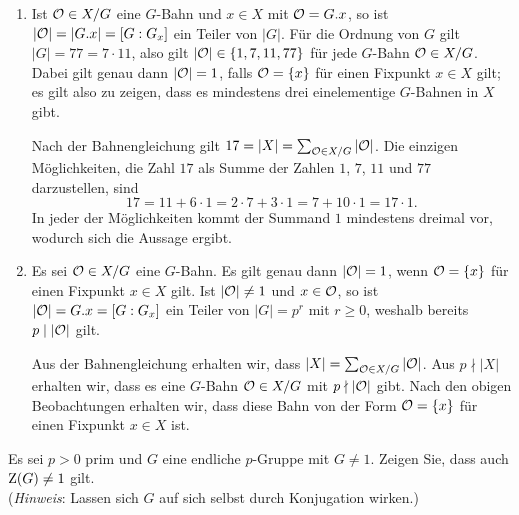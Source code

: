 \begin{solution}
  \begin{enumerate}
    \item
      Ist $\mathcal{O} \in X/G$ eine $G$-Bahn und $x \in X$ mit $\mathcal{O} = G.x$, so ist $|\mathcal{O}| = |G.x| = [G : G_x]$ ein Teiler von $|G|$.
      Für die Ordnung von $G$ gilt $|G| = 77 = 7 \cdot 11$, also gilt $|\mathcal{O}| \in \{1, 7, 11, 77\}$ für jede $G$-Bahn $\mathcal{O} \in X/G$.
      Dabei gilt genau dann $|\mathcal{O}| = 1$, falls $\mathcal{O} = \{x\}$ für einen Fixpunkt $x \in X$ gilt;
      es gilt also zu zeigen, dass es mindestens drei einelementige $G$-Bahnen in $X$ gibt.
      
      Nach der Bahnengleichung gilt $17 = |X| = \sum_{\mathcal{O} \in X/G} |\mathcal{O}|$.
      Die einzigen Möglichkeiten, die Zahl $17$ als Summe der Zahlen $1$, $7$, $11$ und $77$ darzustellen, sind
      \[
          17
        = 11 + 6 \cdot 1
        = 2 \cdot 7 + 3 \cdot 1
        = 7 + 10 \cdot 1
        = 17 \cdot 1.
      \]
      In jeder der Möglichkeiten kommt der Summand $1$ mindestens dreimal vor, wodurch sich die Aussage ergibt.
      
    \item
      Es sei $\mathcal{O} \in X/G$ eine $G$-Bahn.
      Es gilt genau dann $|\mathcal{O}| = 1$, wenn $\mathcal{O} = \{x\}$ für einen Fixpunkt $x \in X$ gilt.
      Ist $|\mathcal{O}| \neq 1$ und $x \in \mathcal{O}$, so ist $|\mathcal{O}| = G.x = [G : G_x]$ ein Teiler von $|G| = p^r$ mit $r \geq 0$, weshalb bereits $p \mid |\mathcal{O}|$ gilt.
      
      Aus der Bahnengleichung erhalten wir, dass $|X| = \sum_{\mathcal{O} \in X/G} |\mathcal{O}|$.
      Aus $p \nmid |X|$ erhalten wir, dass es eine $G$-Bahn $\mathcal{O} \in X/G$ mit $p \nmid |\mathcal{O}|$ gibt.
      Nach den obigen Beobachtungen erhalten wir, dass diese Bahn von der Form $\mathcal{O} = \{x\}$ für einen Fixpunkt $x \in X$ ist.
  \end{enumerate}
\end{solution}


\begin{question}[subtitle = Mehr Bahnenkombinatorik]
  Es sei $p > 0$ prim und $G$ eine endliche $p$-Gruppe mit $G \neq 1$.
  Zeigen Sie, dass auch $\operatorname{Z}(G) \neq 1$ gilt.
  \\
  (\emph{Hinweis}:
   Lassen sich $G$ auf sich selbst durch Konjugation wirken.)
\end{question}


